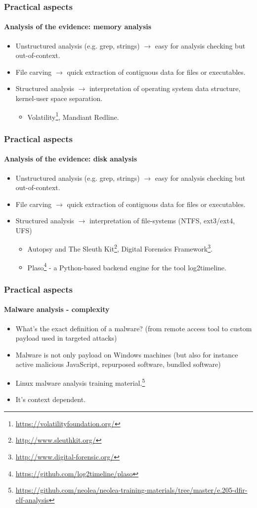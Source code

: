 \begin{frame}[fragile]
\frametitle{Practical aspects}
\framesubtitle{Analysis of the evidence: memory analysis}
\begin{itemize}
\item Unstructured analysis (e.g. grep, strings) $\rightarrow$ easy for analysis checking but out-of-context.
\item File carving $\rightarrow$ quick extraction of contiguous data for files or executables.
\item Structured analysis $\rightarrow$ interpretation of operating system data structure, kernel-user space separation.
\begin{itemize}
\item Volatility\footnote{\url{https://volatilityfoundation.org/}}, Mandiant Redline.
\end{itemize}
\end{itemize}
\end{frame}

\begin{frame}[fragile]
\frametitle{Practical aspects}
\framesubtitle{Analysis of the evidence: disk analysis}
\begin{itemize}
\item Unstructured analysis (e.g. grep, strings) $\rightarrow$ easy for analysis checking but out-of-context.
\item File carving $\rightarrow$ quick extraction of contiguous data for files or executables.
\item Structured analysis $\rightarrow$ interpretation of file-systems (NTFS, ext3/ext4, UFS)
\begin{itemize}
\item Autopsy and The Sleuth Kit\footnote{\url{http://www.sleuthkit.org/}}, Digital Forensics Framework\footnote{\url{http://www.digital-forensic.org/}}.
\item Plaso\footnote{\url{https://github.com/log2timeline/plaso}} - a Python-based backend engine for the tool log2timeline.
\end{itemize}
\end{itemize}
\end{frame}


\begin{frame}[fragile]
\frametitle{Practical aspects}
\framesubtitle{Malware analysis - complexity}
\begin{itemize}
        \item What's the exact definition of a malware? (from remote access tool to custom payload used in targeted attacks)
        \item Malware is not only payload on Windows machines (but also for instance active malicious JavaScript, repurposed software, bundled software)
        \item Linux malware analysis training material.\footnote{\url{https://github.com/neolea/neolea-training-materials/tree/master/e.205-dfir-elf-analysis}}
        \item It's context dependent.
\end{itemize}
\end{frame}

